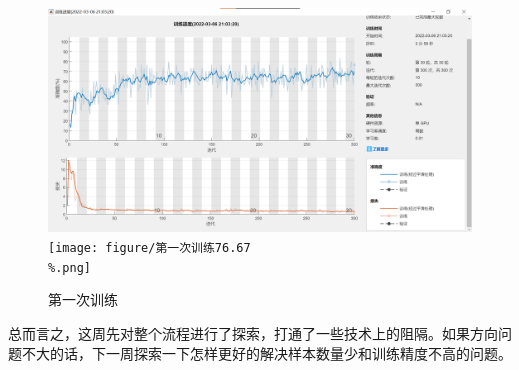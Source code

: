 \documentclass{article}
\begin{document}
	\begin{figure}[h]
		\centering
		\includegraphics[width=15cm]{figure/第一次结果.png}
		\quad
		\texttt{[image: figure/第一次训练76.67\\\%.png]}
		\caption{第一次训练}
	\end{figure}

	总而言之，这周先对整个流程进行了探索，打通了一些技术上的阻隔。如果方向问题不大的话，下一周探索一下怎样更好的解决样本数量少和训练精度不高的问题。
	
\end{document}
